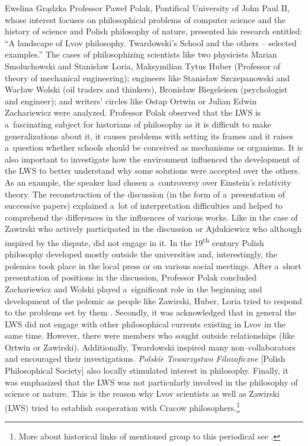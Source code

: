 \begin{editorialeng}{Ewelina Grądzka}
Professor Paweł Polak, Pontifical University of John Paul II, whose interest focuses on philosophical problems of computer science and the history of science and Polish philosophy of nature, presented his research entitled: ``A landscape of Lvov philosophy. Twardowski’s School and the others -- selected examples.'' The cases of philosophizing scientists like two physicists Marian Smoluchowski and Stanisław Loria, Maksymilian Tytus Huber (Professor of theory of mechanical engineering); engineers like Stanisław Szczepanowski and Wacław Wolski (oil traders and thinkers), Bronisław Biegeleisen (psychologist and engineer); and writers’ circles like Ostap Ortwin or Julian Edwin Zachariewicz were analyzed. Professor Polak observed that the LWS is a~fascinating subject for historians of philosophy as it is difficult to make generalizations about it, it causes problems with setting its frames and it raises a~question whether schools should be conceived as mechanisms or organisms. It is also important to investigate how the environment influenced the development of the LWS to better understand why some solutions were accepted over the others. As an example, the speaker had chosen a~controversy over Einstein’s relativity theory. The reconstruction of the discussion (in the form of a~presentation of successive papers) explained a~lot of interpretation difficulties and helped to comprehend the differences in the influences of various works. Like in the case of Zawirski who actively participated in the discussion or Ajdukiewicz who although inspired by the dispute, did not engage in it. In the 19\textsuperscript{th} century Polish philosophy developed mostly outside the universities and, interestingly, the polemics took place in the local press or on various social meetings. After a~short presentation of positions in the discussion, Professor Polak concluded Zachariewicz and Wolski played a~significant role in the beginning and development of the polemic as people like Zawirski, Huber, Loria tried to respond to the problems set by them
\parencite[see also][]{polak_philosophy_2016}. %
 Secondly, it was acknowledged that in general the LWS did not engage with other philosophical currents existing in Lvov in the same time. However, there were members who sought outside relationships (like Ortwin or Zawirski). Additionally, Twardowski inspired many non--collaborators and encouraged their investigations. \textit{Polskie Towarzystwo Filozoficzne} [Polish Philosophical Society] also locally stimulated interest in philosophy. Finally, it was emphasized that the LWS was not particularly involved in the philosophy of science or nature. This is the reason why Lvov scientists as well as Zawirski (LWS) tried to establish cooperation with Cracow philosophers.\footnote{More about historical links of mentioned group to this periodical see 
\parencite[][]{trombik_origin_2019}.%
}


\end{editorialeng}
